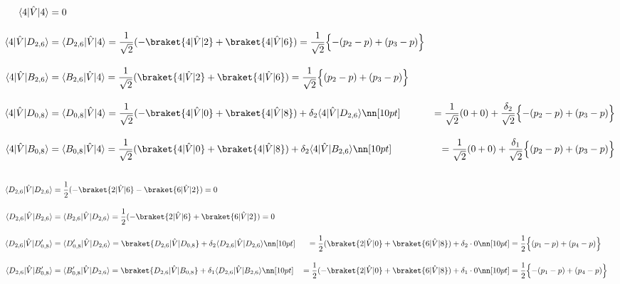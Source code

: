 \begin{align}
    \langle{4|\hat{V}|4}\rangle
    &=0\\[10pt]
    \langle{4|\hat{V}|D_{2,6}}\rangle
    &=\langle{D_{2,6}|\hat{V}|4}\rangle
    =\frac{1}{\sqrt{2}}(-\braket{4|\hat{V}|2} + \braket{4|\hat{V}|6})
    =\frac{1}{\sqrt{2}}\Bigl\{
    -(p_2-p) + (p_3-p)
    \Bigr\}\\[10pt]
    \langle{4|\hat{V}|B_{2,6}}\rangle
    &=\langle{B_{2,6}|\hat{V}|4}\rangle
    =\frac{1}{\sqrt{2}}(\braket{4|\hat{V}|2} + \braket{4|\hat{V}|6})
    =\frac{1}{\sqrt{2}}\Bigl\{
    (p_2-p) + (p_3-p)
    \Bigr\}\\[10pt]
    \langle{4|\hat{V}|D_{0,8}}\rangle
    &=\langle{D_{0,8}|\hat{V}|4}\rangle
    =\frac{1}{\sqrt{2}}(-\braket{4|\hat{V}|0} + \braket{4|\hat{V}|8})
    +\delta_2\langle{4|\hat{V}|D_{2,6}}\rangle\nn[10pt]
    &=\frac{1}{\sqrt{2}}(0+0)
    +\frac{\delta_2}{\sqrt{2}}\Bigl\{
    -(p_2-p) + (p_3-p)
    \Bigr\}\\[10pt]
   \langle{4|\hat{V}|B_{0,8}}\rangle
   &=\langle{B_{0,8}|\hat{V}|4}\rangle
   =\frac{1}{\sqrt{2}}(\braket{4|\hat{V}|0} + \braket{4|\hat{V}|8})
    +\delta_2\langle{4|\hat{V}|B_{2,6}}\rangle\nn[10pt]
    &=\frac{1}{\sqrt{2}}(0+0)
    +\frac{\delta_1}{\sqrt{2}}\Bigl\{
    (p_2-p) + (p_3-p)
    \Bigr\}\\[10pt]
\end{align}



\begin{align}
    \langle{D_{2,6}|\hat{V}|D_{2,6}}\rangle
    &
    =\frac{1}{2}(-\braket{2|\hat{V}|6} - \braket{6|\hat{V}|2})
    =0\\[10pt]
    \langle{D_{2,6}|\hat{V}|B_{2,6}}\rangle
    &=\langle{B_{2,6}|\hat{V}|D_{2,6}}\rangle
    =\frac{1}{2}(-\braket{2|\hat{V}|6} + \braket{6|\hat{V}|2})
    =0\\[10pt]
    \langle{D_{2,6}|\hat{V}|D^\prime_{0,8}}\rangle
    &=\langle{D^\prime_{0,8}|\hat{V}|D_{2,6}}\rangle
    =\braket{D_{2,6}|\hat{V}|D_{0,8}} 
    +\delta_2\langle{D_{2,6}|\hat{V}|D_{2,6}}\rangle\nn[10pt]
    &=\frac{1}{2}(\braket{2|\hat{V}|0}+\braket{6|\hat{V}|8})
    +\delta_2\cdot0\nn[10pt]
    &=\frac{1}{2}\Bigl\{
    (p_1-p) + (p_4-p)
    \Bigr\}\\[10pt]
   \langle{D_{2,6}|\hat{V}|B^\prime_{0,8}}\rangle
   &=\langle{B^\prime_{0,8}|\hat{V}|D_{2,6}}\rangle
    =\braket{D_{2,6}|\hat{V}|B_{0,8}} 
    +\delta_1\langle{D_{2,6}|\hat{V}|B_{2,6}}\rangle\nn[10pt]
    &=\frac{1}{2}(-\braket{2|\hat{V}|0}+\braket{6|\hat{V}|8})
    +\delta_1\cdot0\nn[10pt]
    &=\frac{1}{2}\Bigl\{
    -(p_1-p) + (p_4-p)
    \Bigr\}
\end{align}





